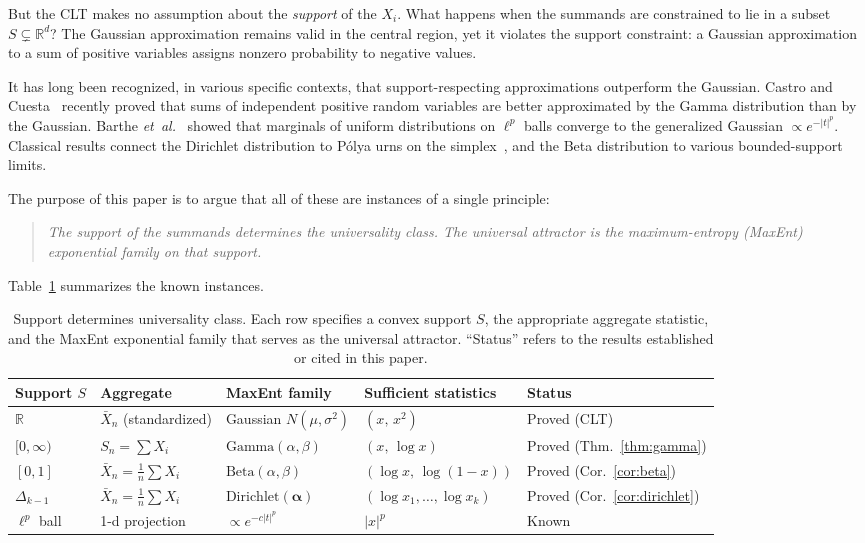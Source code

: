 \documentclass[aps,pre,twocolumn,superscriptaddress,nofootinbib]{revtex4-2}
\theoremstyle{definition}
\theoremstyle{remark}
\newcommand{\R}{\mathbb{R}}
\begin{document}
But the CLT makes no assumption about the \emph{support} of the $X_i$. What
happens when the summands are constrained to lie in a subset
$S\subsetneq\R^d$? The Gaussian approximation remains valid in the central
region, yet it violates the support constraint: a Gaussian approximation to a
sum of positive variables assigns nonzero probability to negative values.

It has long been recognized, in various specific contexts, that
support-respecting approximations outperform the Gaussian.
Castro and Cuesta~\cite{CastroCuesta2026} recently proved that sums of
independent positive random variables are better approximated by the Gamma
distribution than by the Gaussian. Barthe \emph{et~al.}~\cite{Barthe2005}
showed that marginals of uniform distributions on $\ell^p$ balls converge to
the generalized Gaussian $\propto e^{-|t|^p}$. Classical results connect the
Dirichlet distribution to P\'{o}lya urns on the
simplex~\cite{BlackwellMacQueen1973}, and the Beta distribution to various
bounded-support limits.

The purpose of this paper is to argue that all of these are instances of a
single principle:

\begin{quote}
\emph{The support of the summands determines the universality class. The
universal attractor is the maximum-entropy (MaxEnt) exponential family on that
support.}
\end{quote}

\noindent Table~\ref{tab:cases} summarizes the known instances.

\begin{table}
\centering
\caption{Support determines universality class.  Each row specifies a convex
support $S$, the appropriate aggregate statistic, and the MaxEnt exponential
family that serves as the universal attractor.  ``Status'' refers to the
results established or cited in this paper.\label{tab:cases}}
\begin{tabular}{lllll}
\toprule
Support $S$ & Aggregate & MaxEnt family & Sufficient statistics & Status \\
\midrule
$\R$ & $\bar{X}_n$ (standardized) & Gaussian $N(\mu,\sigma^2)$ & $(x,\,x^2)$ & Proved (CLT) \\
$[0,\infty)$ & $S_n=\sum X_i$ & $\mathrm{Gamma}(\alpha,\beta)$ & $(x,\,\log x)$ & Proved (Thm.~\ref{thm:gamma}) \\
$[0,1]$ & $\bar{X}_n=\frac{1}{n}\sum X_i$ & $\mathrm{Beta}(\alpha,\beta)$ & $(\log x,\,\log(1{-}x))$ & Proved (Cor.~\ref{cor:beta}) \\
$\Delta_{k-1}$ & $\bar{X}_n=\frac{1}{n}\sum X_i$ & $\mathrm{Dirichlet}(\bm{\alpha})$ & $(\log x_1,\ldots,\log x_k)$ & Proved (Cor.~\ref{cor:dirichlet}) \\
$\ell^p$ ball & 1-d projection & $\propto e^{-c|t|^p}$ & $|x|^p$ & Known~\cite{Barthe2005} \\
\bottomrule
\end{tabular}
\end{table}
\end{document}
